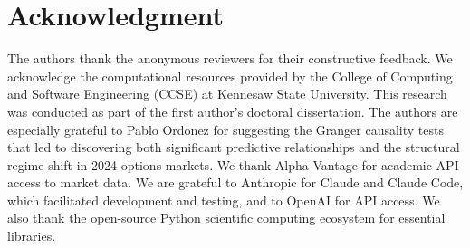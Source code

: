 \documentclass[conference]{IEEEtran}
\begin{document}














\section*{Acknowledgment}
The authors thank the anonymous reviewers for their constructive feedback. We acknowledge the computational resources provided by the College of Computing and Software Engineering (CCSE) at Kennesaw State University. This research was conducted as part of the first author's doctoral dissertation.
The authors are especially grateful to Pablo Ordonez for suggesting the Granger causality tests that led to discovering both significant predictive relationships and the structural regime shift in 2024 options markets.
We thank Alpha Vantage for academic API access to market data. We are grateful to Anthropic for Claude and Claude Code, which facilitated development and testing, and to OpenAI for API access. We also thank the open-source Python scientific computing ecosystem for essential libraries.



\end{document}
